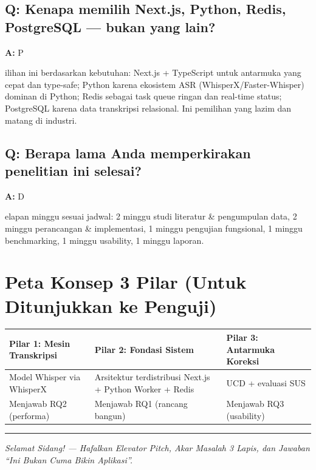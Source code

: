 \documentclass[11pt,a4paper]{article}
\newcommand{\qa}[2]{%
  \subsection*{\color{accent} Q: #1}%
  \textbf{A:} #2\par\vspace{0.6em}%
}
\begin{document}
\qa{Kenapa memilih Next.js, Python, Redis, PostgreSQL --- bukan yang lain?}
Pilihan ini berdasarkan kebutuhan: Next.js + TypeScript untuk antarmuka yang cepat dan type-safe; Python karena ekosistem ASR (WhisperX/Faster-Whisper) dominan di Python; Redis sebagai task queue ringan dan real-time status; PostgreSQL karena data transkripsi relasional. Ini pemilihan yang lazim dan matang di industri.

\qa{Berapa lama Anda memperkirakan penelitian ini selesai?}
Delapan minggu sesuai jadwal: 2 minggu studi literatur \& pengumpulan data, 2 minggu perancangan \& implementasi, 1 minggu pengujian fungsional, 1 minggu benchmarking, 1 minggu usability, 1 minggu laporan.

\section{Peta Konsep 3 Pilar (Untuk Ditunjukkan ke Penguji)}

\begin{center}
\renewcommand{\arraystretch}{1.4}
\begin{tabular}{|p{4cm}|p{4cm}|p{4cm}|}
\hline
\rowcolor{lightgray} \textbf{Pilar 1: Mesin Transkripsi} & \textbf{Pilar 2: Fondasi Sistem} & \textbf{Pilar 3: Antarmuka Koreksi} \\
\hline
Model Whisper via WhisperX & Arsitektur terdistribusi Next.js + Python Worker + Redis & UCD + evaluasi SUS \\
\hline
Menjawab RQ2 (performa) & Menjawab RQ1 (rancang bangun) & Menjawab RQ3 (usability) \\
\hline
\end{tabular}
\end{center}

\vspace{0.5em}
\noindent\rule{\textwidth}{1pt}

\begin{center}
\small \emph{Selamat Sidang! --- Hafalkan Elevator Pitch, Akar Masalah 3 Lapis, dan Jawaban ``Ini Bukan Cuma Bikin Aplikasi''.}
\end{center}
\end{document}
